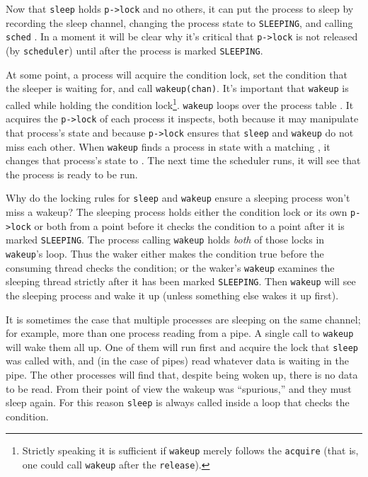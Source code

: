 Now that
\lstinline{sleep}
holds
\lstinline{p->lock}
and no others,
it can put the process to sleep by recording
the sleep channel,
changing the process state to \texttt{SLEEPING},
and calling
\lstinline{sched}
.
In a moment it will be clear why it's critical that
\lstinline{p->lock} is not released (by \lstinline{scheduler}) until after
the process is marked \texttt{SLEEPING}.

At some point, a process will acquire the condition lock,
set the condition that the sleeper is waiting for,
and call \lstinline{wakeup(chan)}.
It's important that \lstinline{wakeup} is called
while holding the condition lock\footnote{%
%
Strictly speaking it is sufficient if
\lstinline{wakeup}
merely follows the
\lstinline{acquire}
(that is, one could call
\lstinline{wakeup}
after the
\lstinline{release}).%
%
}.
\lstinline{wakeup}
loops over the process table
.
It acquires the
\lstinline{p->lock}
of each process it inspects,
both because it may manipulate that process's state
and because
\lstinline{p->lock}
ensures that
\lstinline{sleep}
and
\lstinline{wakeup}
do not miss each other.
When \lstinline{wakeup} finds a process in state
with a matching
,
it changes that process's state to
.
The next time the scheduler runs, it will
see that the process is ready to be run.

Why do the locking rules for 
\lstinline{sleep}
and
\lstinline{wakeup}
ensure a sleeping process won't miss a wakeup?
The sleeping process holds either
the condition lock or its own
\lstinline{p->lock} 
or both from a point before it checks the condition
to a point after it is marked \texttt{SLEEPING}.
The process calling \texttt{wakeup} holds \textit{both}
of those locks in \texttt{wakeup}'s loop.
Thus the waker either makes the condition true before
the consuming thread checks the condition;
or the waker's \lstinline{wakeup} examines the sleeping
thread strictly after it has been marked \texttt{SLEEPING}.
Then 
\lstinline{wakeup}
will see the sleeping process and wake it up
(unless something else wakes it up first).

It is sometimes the case that multiple processes are sleeping
on the same channel; for example, more than one process
reading from a pipe.
A single call to 
\lstinline{wakeup}
will wake them all up.
One of them will run first and acquire the lock that
\lstinline{sleep}
was called with, and (in the case of pipes) read whatever
data is waiting in the pipe.
The other processes will find that, despite being woken up,
there is no data to be read.
From their point of view the wakeup was ``spurious,'' and
they must sleep again.
For this reason \lstinline{sleep} is always called inside a loop that
checks the condition.

